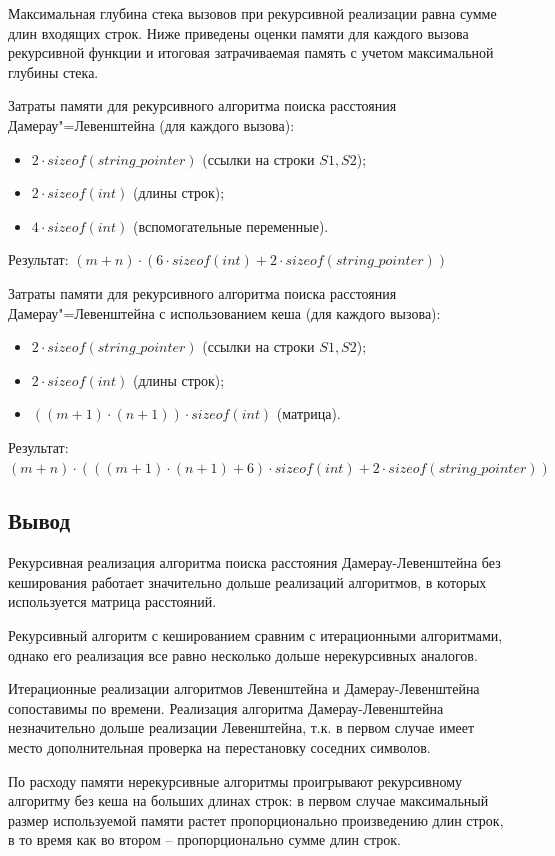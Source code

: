 Максимальная глубина стека вызовов при рекурсивной реализации равна сумме длин входящих строк. Ниже приведены оценки памяти для каждого вызова рекурсивной функции и итоговая затрачиваемая память с учетом максимальной глубины стека.

Затраты памяти для рекурсивного алгоритма поиска расстояния Дамерау"=Левенштейна (для каждого вызова):
	\begin{itemize}
		\item $2 \cdot sizeof(string\_pointer)$ (ссылки на строки $S1, S2$);
		\item $2 \cdot sizeof(int)$ (длины строк);
		\item $4 \cdot sizeof(int)$ (вспомогательные переменные).
	\end{itemize}
	Результат: $(m + n) \cdot (6 \cdot sizeof(int) + 2 \cdot sizeof(string\_pointer))$

Затраты памяти для рекурсивного алгоритма поиска расстояния Дамерау"=Левенштейна с использованием кеша (для каждого вызова): 
	\begin{itemize}
		\item $2 \cdot sizeof(string\_pointer)$ (ссылки на строки $S1, S2$);
		\item $2 \cdot sizeof(int)$ (длины строк);
		\item $((m + 1) \cdot (n + 1)) \cdot sizeof(int)$ (матрица).
	\end{itemize}
	Результат: $(m + n) \cdot (((m + 1) \cdot (n + 1) + 6) \cdot sizeof(int) + 2 \cdot sizeof(string\_pointer))$


\subsection{Вывод}
Рекурсивная реализация алгоритма поиска расстояния Дамерау-\newline Левенштейна без кеширования работает значительно дольше реализаций алгоритмов, в которых используется матрица расстояний.

Рекурсивный алгоритм с кешированием сравним с итерационными алгоритмами, однако его реализация все равно несколько дольше нерекурсивных аналогов.

Итерационные реализации алгоритмов Левенштейна и Дамерау-\newline Левенштейна сопоставимы по времени. Реализация алгоритма Дамерау-\newline Левенштейна незначительно дольше реализации Левенштейна, т.к. в первом случае имеет место дополнительная проверка на перестановку соседних символов.

По расходу памяти нерекурсивные алгоритмы проигрывают рекурсивному алгоритму без кеша на больших длинах строк: в первом случае максимальный размер используемой памяти растет пропорционально произведению длин строк, в то время как во втором -- пропорционально сумме длин строк.
